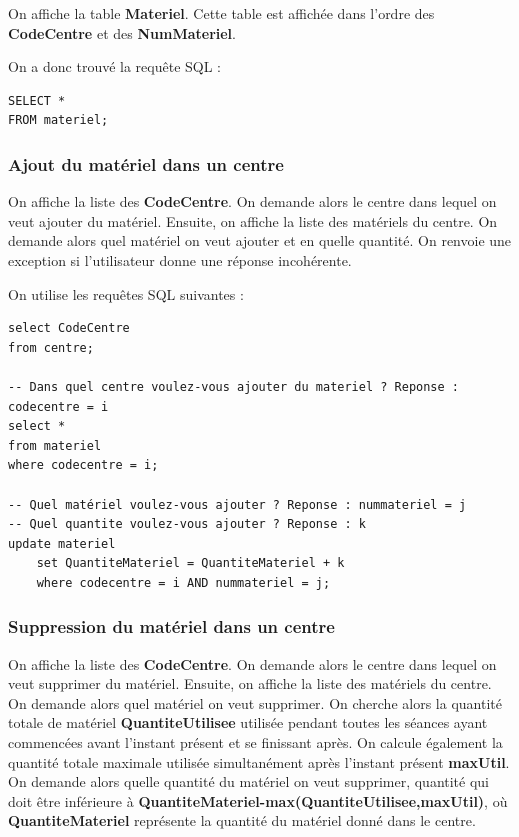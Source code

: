 \documentclass[10pt]{article}
\begin{document}
On affiche la table \textbf{Materiel}. Cette table est affichée dans l'ordre des \textbf{CodeCentre} et des \textbf{NumMateriel}.

On a donc trouvé la requête SQL :
\begin{small}
\begin{verbatim}
SELECT *
FROM materiel;
\end{verbatim}
\end{small}

\subsubsection{Ajout du matériel dans un centre}

On affiche la liste des \textbf{CodeCentre}. On demande alors le centre dans lequel on veut ajouter du matériel. Ensuite,
on affiche la liste des matériels du centre. On demande alors quel matériel on veut ajouter et en quelle quantité. On renvoie une exception si l'utilisateur donne une réponse incohérente.

On utilise les requêtes SQL suivantes :

\begin{small}
\begin{verbatim}
select CodeCentre
from centre;

-- Dans quel centre voulez-vous ajouter du materiel ? Reponse : codecentre = i
select *
from materiel 
where codecentre = i;

-- Quel matériel voulez-vous ajouter ? Reponse : nummateriel = j
-- Quel quantite voulez-vous ajouter ? Reponse : k
update materiel
	set QuantiteMateriel = QuantiteMateriel + k
	where codecentre = i AND nummateriel = j;
\end{verbatim}
\end{small}

\subsubsection{Suppression du matériel dans un centre}

On affiche la liste des \textbf{CodeCentre}. On demande alors le centre dans lequel on veut supprimer du matériel. Ensuite, on affiche la liste des matériels du centre. On demande alors quel matériel on veut supprimer. On cherche
alors la quantité totale de matériel \textbf{QuantiteUtilisee} utilisée pendant toutes les séances ayant commencées avant l'instant présent et se finissant après. On calcule également la quantité totale maximale utilisée simultanément après l'instant présent \textbf{maxUtil}. On demande alors quelle quantité du matériel on veut supprimer, quantité qui doit être inférieure à \textbf{QuantiteMateriel-max(QuantiteUtilisee,maxUtil)}, où \textbf{QuantiteMateriel} représente la quantité du matériel donné dans le centre.
\end{document}
